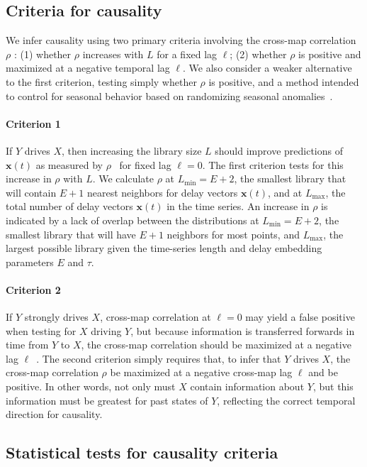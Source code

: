 \documentclass[10pt,letterpaper]{article}
\newcommand{\bx}{\mathbf{x}}
\begin{document}
\subsection*{Criteria for causality}

We infer causality using two primary criteria involving the cross-map correlation $\rho$ \cite{Sugihara2012, Ye2015}: (1) whether $\rho$ increases with $L$ for a fixed lag $\ell$; (2) whether $\rho$ is positive and maximized at a negative temporal lag $\ell$.
We also consider a weaker alternative to the first criterion, testing simply whether $\rho$ is positive, and a method intended to control for seasonal behavior based on randomizing seasonal anomalies~\cite{Deyle2016b}.

\paragraph{Criterion 1}
If $Y$ drives $X$, then increasing the library size $L$ should improve predictions of $\bx(t)$ as measured by $\rho$~\cite{Sugihara2012} for fixed lag $\ell = 0$.
The first criterion tests for this increase in $\rho$ with $L$.
We calculate $\rho$ at $L_{\min} = E + 2$, the smallest library that will contain $E + 1$ nearest neighbors for delay vectors $\bx(t)$, and at $L_{\max}$, the total number of delay vectors $\bx(t)$ in the time series.
An increase in $\rho$ is indicated by a lack of overlap between the distributions at $L_{\min} = E + 2$, the smallest library that will have $E + 1$ neighbors for most points, and $L_{\max}$, the largest possible library given the time-series length and delay embedding parameters $E$ and $\tau$.

\paragraph{Criterion 2}
If $Y$ strongly drives $X$, cross-map correlation at $\ell = 0$ may yield a false positive when testing for $X$ driving $Y$, but because information is transferred forwards in time from $Y$ to $X$, the cross-map correlation should be maximized at a negative lag $\ell$~\cite{Ye2015}.
The second criterion simply requires that, to infer that $Y$ drives $X$, the cross-map correlation $\rho$ be maximized at a negative cross-map lag $\ell$ and be positive.
In other words, not only must $X$ contain information about $Y$, but this information must be greatest for past states of $Y$, reflecting the correct temporal direction for causality.

\subsection*{Statistical tests for causality criteria}
\end{document}

